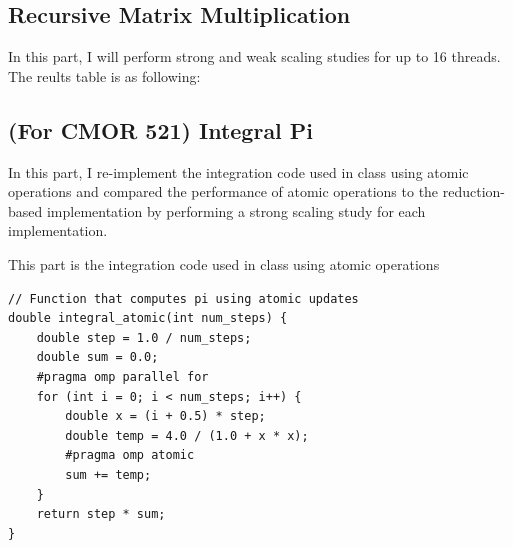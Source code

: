 \documentclass[11pt]{article}
\begin{document}
\subsection{Recursive Matrix Multiplication}

In this part, I will perform strong and weak scaling studies for up to 16 threads. The reults table is as following:
\begin{table}[H]
\centering
{}
\caption{Recursive Matrix Multiplication: Strong and Weak Scaling Results}
\label{tab:recursive_matmul_scaling}
\end{table}


\subsection{(For CMOR 521)  Integral Pi}
In this part, I re-implement the integration code used in class using atomic operations and compared the performance of atomic operations to the reduction-based implementation by performing a strong scaling study for each implementation.

This part is the integration code used in class using atomic operations
\begin{verbatim}
// Function that computes pi using atomic updates
double integral_atomic(int num_steps) {
    double step = 1.0 / num_steps;
    double sum = 0.0;
    #pragma omp parallel for
    for (int i = 0; i < num_steps; i++) {
        double x = (i + 0.5) * step;
        double temp = 4.0 / (1.0 + x * x);
        #pragma omp atomic
        sum += temp;
    }
    return step * sum;
}
\end{verbatim}
\end{document}
